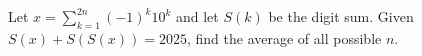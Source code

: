 Let $x=\sum_{k=1}^{2n}(-1)^k10^k$ and let $S(k)$ be the digit sum. Given $S(x)+S(S(x))=2025$, find the average of all possible $n$.
